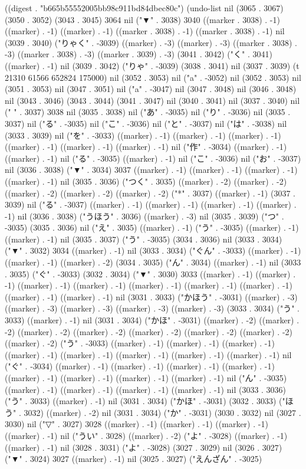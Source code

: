 
((digest . "b665b55552005bb98c911bd84dbec80c") (undo-list nil (3065 . 3067) (3050 . 3052) (3043 . 3045) 3064 nil ("▼" . 3038) 3040 ((marker . 3038) . -1) ((marker) . -1) ((marker) . -1) ((marker . 3038) . -1) ((marker . 3038) . -1) nil (3039 . 3040) ("りゃく" . -3039) ((marker) . -3) ((marker) . -3) ((marker . 3038) . -3) ((marker . 3038) . -3) ((marker . 3039) . -3) (3041 . 3042) ("く" . 3041) ((marker) . -1) nil (3039 . 3042) ("りゃ" . -3039) (3038 . 3041) nil (3037 . 3039) (t 21310 61566 652824 175000) nil (3052 . 3053) nil ("a" . -3052) nil (3052 . 3053) nil (3051 . 3053) nil (3047 . 3051) nil ("a" . -3047) nil (3047 . 3048) nil (3046 . 3048) nil (3043 . 3046) (3043 . 3044) (3041 . 3047) nil (3040 . 3041) nil (3037 . 3040) nil (" " . 3037) 3038 nil (3035 . 3038) nil ("あ" . -3035) nil ("り" . -3036) nil (3035 . 3037) nil ("る" . -3035) nil ("こ" . -3036) nil ("と" . -3037) nil ("は" . -3038) nil (3033 . 3039) nil ("を" . -3033) ((marker) . -1) ((marker) . -1) ((marker) . -1) ((marker) . -1) ((marker) . -1) ((marker) . -1) nil ("作" . -3034) ((marker) . -1) ((marker) . -1) nil ("る" . -3035) ((marker) . -1) nil ("こ" . -3036) nil ("お" . -3037) nil (3036 . 3038) ("▼" . 3034) 3037 ((marker) . -1) ((marker) . -1) ((marker) . -1) ((marker) . -1) nil (3035 . 3036) ("つく" . 3035) ((marker) . -2) ((marker) . -2) ((marker) . -2) ((marker) . -2) ((marker) . -2) ("*" . 3037) ((marker) . -1) (3037 . 3039) nil ("る" . -3037) ((marker) . -1) ((marker) . -1) ((marker) . -1) ((marker) . -1) nil (3036 . 3038) ("うほう" . 3036) ((marker) . -3) nil (3035 . 3039) ("つ" . -3035) (3035 . 3036) nil ("え" . 3035) ((marker) . -1) ("う" . -3035) ((marker) . -1) ((marker) . -1) nil (3035 . 3037) ("う" . -3035) (3034 . 3036) nil (3033 . 3034) ("▼" . 3032) 3034 ((marker) . -1) nil (3033 . 3034) ("ぐん" . -3033) ((marker) . -1) ((marker) . -1) ((marker) . -2) (3034 . 3035) ("ん" . 3034) ((marker) . -1) nil (3033 . 3035) ("ぐ" . -3033) (3032 . 3034) ("▼" . 3030) 3033 ((marker) . -1) ((marker) . -1) ((marker) . -1) ((marker) . -1) ((marker) . -1) ((marker) . -1) ((marker) . -1) ((marker) . -1) ((marker) . -1) nil (3031 . 3033) ("かほう" . -3031) ((marker) . -3) ((marker) . -3) ((marker) . -3) ((marker) . -3) ((marker) . -3) (3033 . 3034) ("う" . 3033) ((marker) . -1) nil (3031 . 3034) ("かほ" . -3031) ((marker) . -2) ((marker) . -2) ((marker) . -2) ((marker) . -2) ((marker) . -2) ((marker) . -2) ((marker) . -2) ((marker) . -2) ("う" . -3033) ((marker) . -1) ((marker) . -1) ((marker) . -1) ((marker) . -1) ((marker) . -1) ((marker) . -1) ((marker) . -1) ((marker) . -1) nil ("ぐ" . -3034) ((marker) . -1) ((marker) . -1) ((marker) . -1) ((marker) . -1) ((marker) . -1) ((marker) . -1) ((marker) . -1) ((marker) . -1) nil ("ん" . -3035) ((marker) . -1) ((marker) . -1) ((marker) . -1) ((marker) . -1) nil (3033 . 3036) ("う" . 3033) ((marker) . -1) nil (3031 . 3034) ("かほ" . -3031) (3032 . 3033) ("ほう" . 3032) ((marker) . -2) nil (3031 . 3034) ("か" . -3031) (3030 . 3032) nil (3027 . 3030) nil ("▽" . 3027) 3028 ((marker) . -1) ((marker) . -1) ((marker) . -1) ((marker) . -1) nil ("うい" . 3028) ((marker) . -2) ("よ" . -3028) ((marker) . -1) ((marker) . -1) nil (3028 . 3031) ("よ" . -3028) (3027 . 3029) nil (3026 . 3027) ("▼" . 3024) 3027 ((marker) . -1) nil (3025 . 3027) ("えんざん" . -3025) 